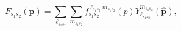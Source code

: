 \begin{equation}
F_{s_{1}s_{2}}(\mathbf{p})=\sum_{\ell
_{s_{1}s_{2}}}\sum_{m_{s_{1}s_{2}}}f_{s_{1}s_{2}}^{\ell
_{s_{1}s_{2}}m_{s_{1}s_{2}}}\left( p\right) Y_{\ell
_{s_{1}s_{2}}}^{m_{s_{1}s_{2}}}(\hat{\mathbf{p}}),
\end{equation}

